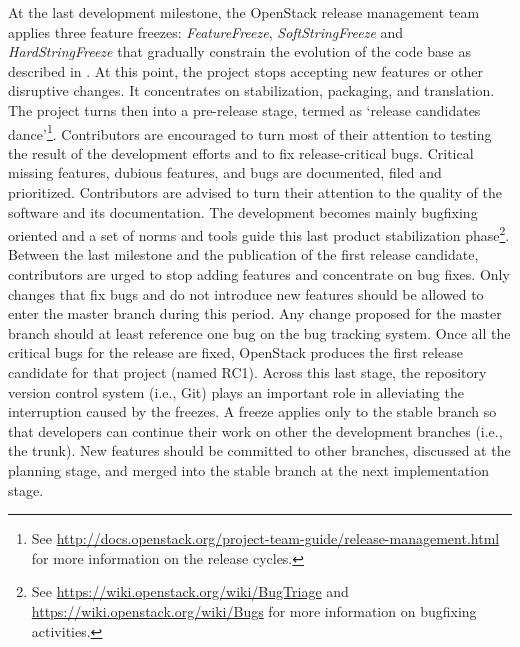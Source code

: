 At the last development milestone, the OpenStack release management team applies three feature freezes:  \emph{FeatureFreeze}, \emph{SoftStringFreeze} and \emph{HardStringFreeze} that gradually constrain the evolution of the code base as described in . At this point, the project stops accepting new features or other disruptive changes. It concentrates on stabilization, packaging, and translation. The project turns then into a pre-release stage, termed as `release candidates dance'\footnote{See \url{http://docs.openstack.org/project-team-guide/release-management.html} for more information on the release cycles.}. Contributors are encouraged to turn most of their attention to testing the result of the development efforts and to fix release-critical bugs. Critical missing features, dubious features, and bugs are documented, filed and prioritized. Contributors are advised to turn their attention to the quality of the software and its documentation. The development becomes mainly bugfixing oriented and a set of norms and tools guide this last product stabilization phase\footnote{See \url{https://wiki.openstack.org/wiki/BugTriage} and \url{https://wiki.openstack.org/wiki/Bugs} for more information on bugfixing activities.}. 
Between the last milestone and the publication of the first release candidate, contributors are urged to stop adding features and concentrate on bug fixes. Only changes that fix bugs and do not introduce new features should be allowed to enter the master branch during this period.
Any change proposed for the master branch should at least reference one bug on the bug tracking system. Once all the critical bugs for the release are fixed, OpenStack produces the first release candidate for that project (named RC1). Across this last stage, the repository version control system (i.e., Git) plays an important role in alleviating the interruption caused by the freezes. A freeze applies only to the stable branch so that developers can continue their work on other the development branches (i.e., the trunk). New features should be committed to other branches, discussed at the  planning stage, and merged into the stable branch at the next implementation stage.


